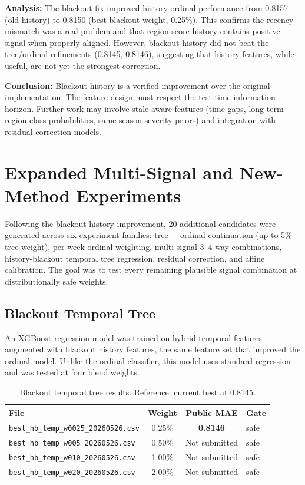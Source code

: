 \documentclass[12pt, a4paper]{article}
\begin{document}
\textbf{Analysis:} The blackout fix improved history ordinal performance from 0.8157 (old history) to 0.8150 (best blackout weight, 0.25\%). This confirms the recency mismatch was a real problem and that region score history contains positive signal when properly aligned. However, blackout history did not beat the tree/ordinal refinements (0.8145, 0.8146), suggesting that history features, while useful, are not yet the strongest correction.

\textbf{Conclusion:} Blackout history is a verified improvement over the original implementation. The feature design must respect the test-time information horizon. Further work may involve stale-aware features (time gaps, long-term region class probabilities, same-season severity priors) and integration with residual correction models.

\section{Expanded Multi-Signal and New-Method Experiments}

Following the blackout history improvement, 20 additional candidates were generated across six experiment families: tree + ordinal continuation (up to 5\% tree weight), per-week ordinal weighting, multi-signal 3--4-way combinations, history-blackout temporal tree regression, residual correction, and affine calibration. The goal was to test every remaining plausible signal combination at distributionally safe weights.

\subsection{Blackout Temporal Tree}
An XGBoost regression model was trained on hybrid temporal features augmented with blackout history features, the same feature set that improved the ordinal model. Unlike the ordinal classifier, this model uses standard regression and was tested at four blend weights.

\begin{table}[H]
\centering
\caption{Blackout temporal tree results. Reference: current best at 0.8145.}
\label{tab:blktemp}
\begin{tabular}{@{}lccl@{}}
\toprule
\textbf{File} & \textbf{Weight} & \textbf{Public MAE} & \textbf{Gate} \\
\midrule
\texttt{best\_hb\_temp\_w0025\_20260526.csv} & 0.25\% & \textbf{0.8146} & safe \\
\texttt{best\_hb\_temp\_w005\_20260526.csv}  & 0.50\% & Not submitted & safe \\
\texttt{best\_hb\_temp\_w010\_20260526.csv}  & 1.00\% & Not submitted & safe \\
\texttt{best\_hb\_temp\_w020\_20260526.csv}  & 2.00\% & Not submitted & safe \\
\bottomrule
\end{tabular}
\end{table}
\end{document}
